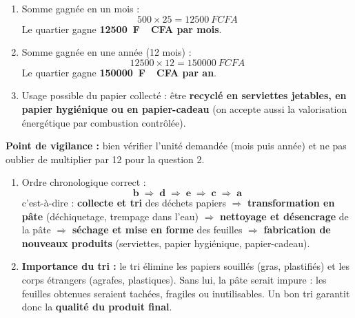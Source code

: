 \documentclass[11pt]{article}
\begin{document}
\begin{corrige}
\begin{enumerate}
\item Somme gagnée en un mois :
\[ 500 \times 25 = \SI{12500}{F\!CFA} \]
Le quartier gagne \textbf{\SI{12500}{F\!CFA} par mois}.
\item Somme gagnée en une année (12 mois) :
\[ 12500 \times 12 = \SI{150000}{F\!CFA} \]
Le quartier gagne \textbf{\SI{150000}{F\!CFA} par an}.
\item Usage possible du papier collecté : être \textbf{recyclé en serviettes jetables, en papier hygiénique ou en papier-cadeau} (on accepte aussi la valorisation énergétique par combustion contrôlée).
\end{enumerate}
\textbf{Point de vigilance :} bien vérifier l'unité demandée (mois puis année) et ne pas oublier de multiplier par 12 pour la question 2.
\end{corrige}

\begin{corrige}
\begin{enumerate}
\item Ordre chronologique correct :
\[ \textbf{b} \;\Rightarrow\; \textbf{d} \;\Rightarrow\; \textbf{e} \;\Rightarrow\; \textbf{c} \;\Rightarrow\; \textbf{a} \]
c'est-à-dire : \textbf{collecte et tri} des déchets papiers $\Rightarrow$ \textbf{transformation en pâte} (déchiquetage, trempage dans l'eau) $\Rightarrow$ \textbf{nettoyage et désencrage} de la pâte $\Rightarrow$ \textbf{séchage et mise en forme} des feuilles $\Rightarrow$ \textbf{fabrication de nouveaux produits} (serviettes, papier hygiénique, papier-cadeau).
\item \textbf{Importance du tri :} le tri élimine les papiers souillés (gras, plastifiés) et les corps étrangers (agrafes, plastiques). Sans lui, la pâte serait impure : les feuilles obtenues seraient tachées, fragiles ou inutilisables. Un bon tri garantit donc la \textbf{qualité du produit final}.
\end{enumerate}
\end{corrige}
\end{document}
